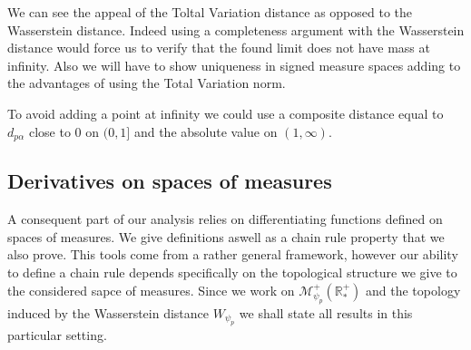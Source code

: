 \documentclass[11pt,a4paper]{article}
\newcommand{\RRP}{\mathbb{R}^+_*}
\newcommand{\MC}{\mathcal{M}}
\begin{document}
We can see the appeal of the Toltal Variation distance as opposed to the Wasserstein distance. Indeed using a completeness argument with the Wasserstein distance would force us to verify that the found limit does not have mass at infinity. Also we will have to show uniqueness in signed measure spaces adding to the advantages of using the Total Variation norm. 

To avoid adding a point at infinity we could use a composite distance equal to $d_{p\alpha}$ close to $0$ on $(0,1]$ and the absolute value on $(1, \infty)$. 
\subsection{Derivatives on spaces of measures}
A consequent part of our analysis relies on differentiating functions defined on spaces of measures. We give definitions aswell as a chain rule property that we also prove. This tools come from a rather general framework, however our ability to define a chain rule depends specifically on the topological structure we give to the considered sapce of measures. Since we work on $\MC^+_{\psi_p}(\RRP)$ and the topology induced by the Wasserstein distance $W_{\psi_p}$ we shall state all results in this particular setting.
\end{document}
